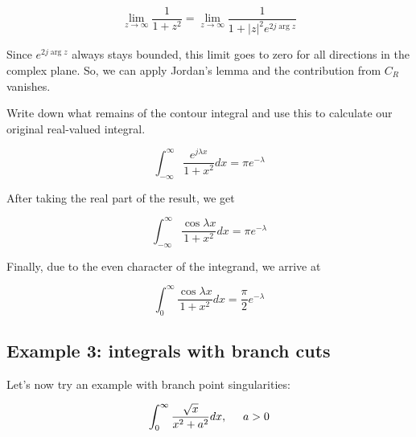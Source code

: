 \begin{equation}
\lim_{z \to \infty}\frac{1}{1+z^2} = \lim_{z \to \infty}\frac{1}{1+|z|^2 e^{2 j
\arg z}}
\end{equation}

Since $e^{2 j \arg z}$ always stays bounded, this limit goes to zero for all directions in the complex plane. So, we can apply Jordan's lemma and the contribution from ${C_R}$ vanishes.

\begin{cue}
Write down what remains of the contour integral and use this to calculate our original real-valued integral.
\end{cue}

\begin{equation}
\int_{-\infty}^{\infty}\frac{e^{j \lambda x}}{1 + x^2} dx = \pi e^{-\lambda}
\end{equation}

\noindent{}After taking the real part of the result, we get

\begin{equation}
\int_{-\infty}^{\infty}\frac{\cos \lambda x}{1 + x^2} dx = \pi e^{-\lambda}
\end{equation}

Finally, due to the even character of the integrand, we arrive at

\begin{equation}
\int_0^{\infty}\frac{\cos \lambda x}{1 + x^2} dx = \frac{\pi}{2} e^{-\lambda}
\end{equation}

\subsection*{Example 3: integrals with branch cuts}

Let's now try an example with branch point singularities:

\begin{equation}
\int_0^{\infty}\frac{\sqrt{x}}{x^2+a^2}dx, \hspace{0.5cm} a > 0
\end{equation}


